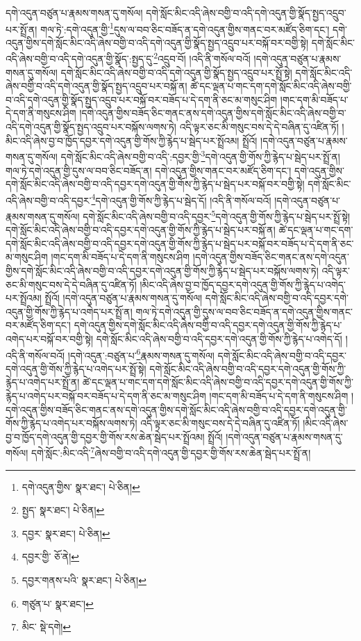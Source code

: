 དགེ་འདུན་བཙུན་པ་རྣམས་གསན་དུ་གསོལ། དགེ་སློང་མིང་འདི་ཞེས་བགྱི་བ་འདི་དགེ་འདུན་གྱི་སྣོད་སྤྱད་འདྲུབ་པར་སྤྲོ་ན། གལ་ཏེ་:དགེ་འདུན་གྱི་\footnote{དགེ་འདུན་གྱིས་  སྣར་ཐང་།  པེ་ཅིན། }དུས་ལ་བབ་ཅིང་བཟོད་ན་དགེ་འདུན་གྱིས་གནང་བར་མཛོད་ཅིག་དང་། དགེ་འདུན་གྱིས་དགེ་སློང་མིང་འདི་ཞེས་བགྱི་བ་འདི་དགེ་འདུན་གྱི་སྣོད་སྤྱད་འདྲུབ་པར་བསྐོ་བར་བགྱི་སྟེ། དགེ་སློང་མིང་འདི་ཞེས་བགྱི་བ་འདི་དགེ་འདུན་གྱི་སྣོད་:སྤྱད་དུ་\footnote{སྤྱད་  སྣར་ཐང་།  པེ་ཅིན། }འདྲུབ་བོ། །འདི་ནི་གསོལ་བའོ། །དགེ་འདུན་བཙུན་པ་རྣམས་གསན་དུ་གསོལ། དགེ་སློང་མིང་འདི་ཞེས་བགྱི་བ་འདི་དགེ་འདུན་གྱི་སྣོད་སྤྱད་འདྲུབ་པར་སྤྲོ་སྟེ། དགེ་སློང་མིང་འདི་ཞེས་བགྱི་བ་འདི་དགེ་འདུན་གྱི་སྣོད་སྤྱད་འདྲུབ་པར་བསྐོ་ན། ཚེ་དང་ལྡན་པ་གང་དག་དགེ་སློང་མིང་འདི་ཞེས་བགྱི་བ་འདི་དགེ་འདུན་གྱི་སྣོད་སྤྱད་འདྲུབ་པར་བསྐོ་བར་བཟོད་པ་དེ་དག་ནི་ཅང་མ་གསུང་ཤིག །གང་དག་མི་བཟོད་པ་དེ་དག་ནི་གསུངས་ཤིག །དགེ་འདུན་གྱིས་བཟོད་ཅིང་གནང་ནས་དགེ་འདུན་གྱིས་དགེ་སློང་མིང་འདི་ཞེས་བགྱི་བ་འདི་དགེ་འདུན་གྱི་སྣོད་སྤྱད་འདྲུབ་པར་བསྐོས་ལགས་ཏེ། འདི་ལྟར་ཅང་མི་གསུང་བས་དེ་དེ་བཞིན་དུ་འཛིན་ཏོ། །མིང་འདི་ཞེས་བྱ་བ་ཁྱོད་དབྱར་དགེ་འདུན་གྱི་གོས་ཀྱི་རྙེད་པ་སྦེད་པར་སྤྲོའམ། སྤྲོའོ། །དགེ་འདུན་བཙུན་པ་རྣམས་གསན་དུ་གསོལ། དགེ་སློང་མིང་འདི་ཞེས་བགྱི་བ་འདི་:དབྱར་གྱི་\footnote{དབྱར་  སྣར་ཐང་།  པེ་ཅིན། }དགེ་འདུན་གྱི་གོས་ཀྱི་རྙེད་པ་སྦེད་པར་སྤྲོ་ན། གལ་ཏེ་དགེ་འདུན་གྱི་དུས་ལ་བབ་ཅིང་བཟོད་ན། དགེ་འདུན་གྱིས་གནང་བར་མཛོད་ཅིག་དང་། དགེ་འདུན་གྱིས་དགེ་སློང་མིང་འདི་ཞེས་བགྱི་བ་འདི་དབྱར་དགེ་འདུན་གྱི་གོས་ཀྱི་རྙེད་པ་སྦེད་པར་བསྐོ་བར་བགྱི་སྟེ། དགེ་སློང་མིང་འདི་ཞེས་བགྱི་བ་འདི་དབྱར་\footnote{དབྱར་གྱི་  ཅོ་ནེ། }དགེ་འདུན་གྱི་གོས་ཀྱི་རྙེད་པ་སྦེད་དོ། །འདི་ནི་གསོལ་བའོ། །དགེ་འདུན་བཙུན་པ་རྣམས་གསན་དུ་གསོལ། དགེ་སློང་མིང་འདི་ཞེས་བགྱི་བ་འདི་དབྱར་\footnote{དབྱར་གནས་པའི་  སྣར་ཐང་།  པེ་ཅིན། }དགེ་འདུན་གྱི་གོས་ཀྱི་རྙེད་པ་སྦེད་པར་སྤྲོ་སྟེ། དགེ་སློང་མིང་འདི་ཞེས་བགྱི་བ་འདི་དབྱར་དགེ་འདུན་གྱི་གོས་ཀྱི་རྙེད་པ་སྦེད་པར་བསྐོ་ན། ཚེ་དང་ལྡན་པ་གང་དག་དགེ་སློང་མིང་འདི་ཞེས་བགྱི་བ་འདི་དབྱར་དགེ་འདུན་གྱི་གོས་ཀྱི་རྙེད་པ་སྦེད་པར་བསྐོ་བར་བཟོད་པ་དེ་དག་ནི་ཅང་མ་གསུང་ཤིག །གང་དག་མི་བཟོད་པ་དེ་དག་ནི་གསུངས་ཤིག །དགེ་འདུན་གྱིས་བཟོད་ཅིང་གནང་ནས་དགེ་འདུན་གྱིས་དགེ་སློང་མིང་འདི་ཞེས་བགྱི་བ་འདི་དབྱར་དགེ་འདུན་གྱི་གོས་ཀྱི་རྙེད་པ་སྦེད་པར་བསྐོས་ལགས་ཏེ། འདི་ལྟར་ཅང་མི་གསུང་བས་དེ་དེ་བཞིན་དུ་འཛིན་ཏོ། །མིང་འདི་ཞེས་བྱ་བ་ཁྱོད་དབྱར་དགེ་འདུན་གྱི་གོས་ཀྱི་རྙེད་པ་འགེད་པར་སྤྲོའམ། སྤྲོའོ། །དགེ་འདུན་བཙུན་པ་རྣམས་གསན་དུ་གསོལ། དགེ་སློང་མིང་འདི་ཞེས་བགྱི་བ་འདི་དབྱར་དགེ་འདུན་གྱི་གོས་ཀྱི་རྙེད་པ་འགེད་པར་སྤྲོ་ན། གལ་ཏེ་དགེ་འདུན་གྱི་དུས་ལ་བབ་ཅིང་བཟོད་ན་དགེ་འདུན་གྱིས་གནང་བར་མཛོད་ཅིག་དང་། དགེ་འདུན་གྱིས་དགེ་སློང་མིང་འདི་ཞེས་བགྱི་བ་འདི་དབྱར་དགེ་འདུན་གྱི་གོས་ཀྱི་རྙེད་པ་འགེད་པར་བསྐོ་བར་བགྱི་སྟེ། དགེ་སློང་མིང་འདི་ཞེས་བགྱི་བ་འདི་དབྱར་དགེ་འདུན་གྱི་གོས་ཀྱི་རྙེད་པ་འགེད་དོ། །འདི་ནི་གསོལ་བའོ། །དགེ་འདུན་:བཙུན་པ་\footnote{གཙུན་པ་  སྣར་ཐང་། }རྣམས་གསན་དུ་གསོལ། དགེ་སློང་མིང་འདི་ཞེས་བགྱི་བ་འདི་དབྱར་དགེ་འདུན་གྱི་གོས་ཀྱི་རྙེད་པ་འགེད་པར་སྤྲོ་སྟེ། དགེ་སློང་མིང་འདི་ཞེས་བགྱི་བ་འདི་དབྱར་དགེ་འདུན་གྱི་གོས་ཀྱི་རྙེད་པ་འགེད་པར་སྤྲོ་ན། ཚེ་དང་ལྡན་པ་གང་དག་དགེ་སློང་མིང་འདི་ཞེས་བགྱི་བ་འདི་དབྱར་དགེ་འདུན་གྱི་གོས་ཀྱི་རྙེད་པ་འགེད་པར་བསྐོ་བར་བཟོད་པ་དེ་དག་ནི་ཅང་མ་གསུང་ཤིག །གང་དག་མི་བཟོད་པ་དེ་དག་ནི་གསུངས་ཤིག །དགེ་འདུན་གྱིས་བཟོད་ཅིང་གནང་ནས་དགེ་འདུན་གྱིས་དགེ་སློང་མིང་འདི་ཞེས་བགྱི་བ་འདི་དབྱར་དགེ་འདུན་གྱི་གོས་ཀྱི་རྙེད་པ་འགེད་པར་བསྐོས་ལགས་ཏེ། འདི་ལྟར་ཅང་མི་གསུང་བས་དེ་དེ་བཞིན་དུ་འཛིན་ཏོ། །མིང་འདི་ཞེས་བྱ་བ་ཁྱོད་དགེ་འདུན་གྱི་དབྱར་གྱི་གོས་རས་ཆེན་སྦེད་པར་སྤྲོའམ། སྤྲོའོ། །དགེ་འདུན་བཙུན་པ་རྣམས་གསན་དུ་གསོལ། དགེ་སློང་:མིང་འདི་\footnote{མིང་  སྡེ་དགེ། }ཞེས་བགྱི་བ་འདི་དགེ་འདུན་གྱི་དབྱར་གྱི་གོས་རས་ཆེན་སྦེད་པར་སྤྲོ་ན། 